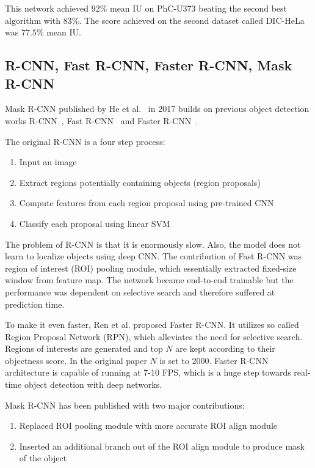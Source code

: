 This network achieved 92\% mean IU on PhC-U373 beating the second best algorithm
with 83\%. The score achieved on the second dataset called DIC-HeLa was $77.5\%$ mean IU.

\subsection{R-CNN, Fast R-CNN, Faster R-CNN, Mask R-CNN}
\label{sec:semantic_seg_cnn:maskrcnn}

Mask R-CNN published by He et al.~\cite{bib:he2017mask} in 2017 builds on previous
object detection works R-CNN~\cite{bib:girshick2014rich},
Fast R-CNN~\cite{bib:girshick2015fast} and Faster R-CNN~\cite{bib:ren2015faster}.

The original R-CNN is a four step process:
\begin{enumerate}
	\item Input an image
	\item Extract regions potentially containing objects (region proposals)
	\item Compute features from each region proposal using pre-trained CNN
	\item Classify each proposal using linear SVM
\end{enumerate}

The problem of R-CNN is that it is enormously slow. Also, the model does not learn to
localize objects using deep CNN. The contribution of Fast R-CNN was region of
interest (ROI) pooling module, which essentially extracted fixed-size window
from feature map. The network became end-to-end trainable but the performance
was dependent on selective search and therefore suffered at prediction time.

To make it even faster, Ren et al. proposed Faster R-CNN. It utilizes so called
Region Proposal Network (RPN), which alleviates the need for selective search. Regions
of interests are generated and top $N$ are kept according to their objectness
score. In the original paper $N$ is set to 2000.
Faster
R-CNN architecture is capable of running at 7-10 FPS, which is a huge step towards
real-time object detection with deep networks.

Mask R-CNN has been published with two major contributions:
\begin{enumerate}
	\item Replaced ROI pooling module with more accurate ROI align module
	\item Inserted an additional branch out of the ROI align module to produce 
	mask of the object
\end{enumerate}

